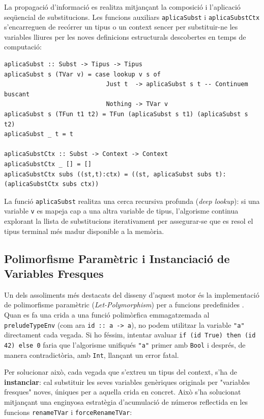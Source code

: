 La propagació d'informació es realitza mitjançant la composició i l'aplicació seqüencial de substitucions. Les funcions auxiliars \texttt{aplicaSubst} i \texttt{aplicaSubstCtx} s'encarreguen de recórrer un tipus o un context sencer per substituir-ne les variables lliures per les noves definicions estructurals descobertes en temps de computació:

\begin{lstlisting}[style=haskellstyle, caption=Mecanisme de propagació de substitucions en tipus i contexts]
aplicaSubst :: Subst -> Tipus -> Tipus
aplicaSubst s (TVar v) = case lookup v s of
                            Just t  -> aplicaSubst s t -- Continuem buscant
                            Nothing -> TVar v
aplicaSubst s (TFun t1 t2) = TFun (aplicaSubst s t1) (aplicaSubst s t2)
aplicaSubst _ t = t

aplicaSubstCtx :: Subst -> Context -> Context
aplicaSubstCtx _ [] = []
aplicaSubstCtx subs ((st,t):ctx) = ((st, aplicaSubst subs t): (aplicaSubstCtx subs ctx)) 
\end{lstlisting}

La funció \texttt{aplicaSubst} realitza una cerca recursiva profunda (\textit{deep lookup}): si una variable \texttt{v} es mapeja cap a una altra variable de tipus, l'algorisme continua explorant la llista de substitucions iterativament per assegurar-se que es resol el tipus terminal més madur disponible a la memòria.

\subsection{Polimorfisme Paramètric i Instanciació de Variables Fresques}

Un dels assoliments més destacats del disseny d'aquest motor és la implementació de polimorfisme paramètric (\textit{Let-Polymorphism}) per a funcions predefinides \cite{peyton1987implementation}. Quan es fa una crida a una funció polimòrfica emmagatzemada al \texttt{preludeTypeEnv} (com ara \texttt{id :: a -> a}), no podem utilitzar la variable \texttt{"a"} directament cada vegada. Si ho féssim, intentar avaluar \texttt{if (id True) then (id 42) else 0} faria que l'algorisme unifiqués \texttt{"a"} primer amb \texttt{Bool} i després, de manera contradictòria, amb \texttt{Int}, llançant un error fatal.

Per solucionar això, cada vegada que s'extreu un tipus del context, s'ha de \textbf{instanciar}: cal substituir les seves variables genèriques originals per "variables fresques" noves, úniques per a aquella crida en concret. Això s'ha solucionat mitjançant una enginyosa estratègia d'acumulació de números reflectida en les funcions \texttt{renameTVar} i \texttt{forceRenameTVar}:


